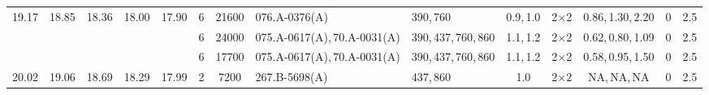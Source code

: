 {\begin{tabular}{cccccccllccccc}
  19.17 & 18.85 & 18.36 & 18.00 & 17.90 & 6  & 21600  & 076.A-0376(A)                                 & 390,\,760                                     & 0.9,\,1.0 & 2$\times$2              & 0.86,\,1.30,\,2.20 & 0     & 2.5 \\
        &       &       &       &       & 6  & 24000  & 075.A-0617(A),\,70.A-0031(A)                  & 390,\,437,\,760,\,860                         & 1.1,\,1.2 & 2$\times$2              & 0.62,\,0.80,\,1.09 & 0     & 2.5 \\
        &       &       &       &       & 6  & 17700  & 075.A-0617(A),\,70.A-0031(A)                  & 390,\,437,\,760,\,860                         & 1.1,\,1.2 & 2$\times$2              & 0.58,\,0.95,\,1.50 & 0     & 2.5 \\
  20.02 & 19.06 & 18.69 & 18.29 & 17.99 & 2  & 7200   & 267.B-5698(A)                                 & 437,\,860                                     & 1.0       & 2$\times$2              & NA,\,NA,\,NA       & 0     & 2.5 \\
\hline
\end{tabular}

\bigskip

}
